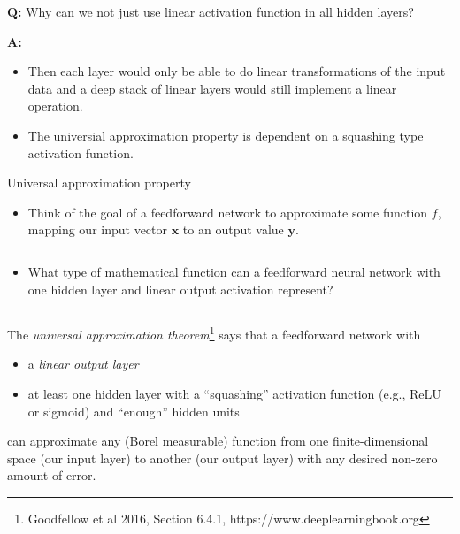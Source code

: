 \documentclass[
  10pt,
  ignorenonframetext,
]{beamer}
\providecommand{\tightlist}{%
  \setlength{\itemsep}{0pt}\setlength{\parskip}{0pt}}
\begin{document}
\begin{frame}
\textbf{Q:} Why can we not just use linear activation function in all
hidden layers?

\pause

\textbf{A:}

\begin{itemize}
\item
  Then each layer would only be able to do linear transformations of the
  input data and a deep stack of linear layers would still implement a
  linear operation.
\item
  The universial approximation property is dependent on a squashing type
  activation function.
\end{itemize}
\end{frame}

\begin{frame}
\begin{block}{Universal approximation property}
\protect\hypertarget{universal-approximation-property}{}
\(~\)

\begin{itemize}
\tightlist
\item
  Think of the goal of a feedforward network to approximate some
  function \(f\), mapping our input vector \({\boldsymbol x}\) to an
  output value \({\boldsymbol y}\).
\end{itemize}

\(~\)

\begin{itemize}
\tightlist
\item
  What type of mathematical function can a feedforward neural network
  with one hidden layer and linear output activation represent?
\end{itemize}

\(~\) \pause

The \emph{universal approximation
theorem}\footnote{Goodfellow et al 2016, Section 6.4.1, https://www.deeplearningbook.org}
says that a feedforward network with \vspace{2mm}

\begin{itemize}
\tightlist
\item
  a \emph{linear output layer}
\item
  at least one hidden layer with a ``squashing'' activation function
  (e.g., ReLU or sigmoid) and ``enough'' hidden units
\end{itemize}

\vspace{2mm}

can approximate any (Borel measurable) function from one
finite-dimensional space (our input layer) to another (our output layer)
with any desired non-zero amount of error.
\end{block}
\end{frame}
\end{document}
